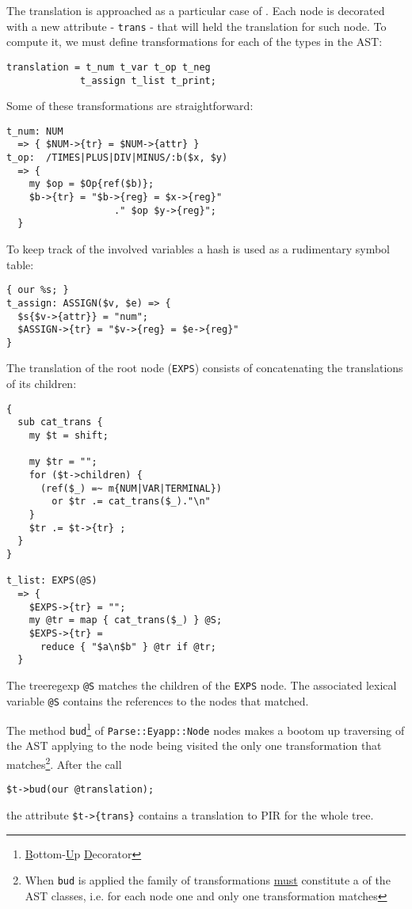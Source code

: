 The translation is approached as a particular case of 
. Each node is decorated with a new
attribute - \verb|trans| - that will held 
the translation for such node.
To compute it, we must define transformations
for each of the types in the AST:
\begin{verbatim}
translation = t_num t_var t_op t_neg
             t_assign t_list t_print;
\end{verbatim}

Some of these transformations are straightforward:
\begin{verbatim}
t_num: NUM 
  => { $NUM->{tr} = $NUM->{attr} }
t_op:  /TIMES|PLUS|DIV|MINUS/:b($x, $y)
  => {
    my $op = $Op{ref($b)};
    $b->{tr} = "$b->{reg} = $x->{reg}"
                   ." $op $y->{reg}";
  }
\end{verbatim}
To keep track of the involved variables
a hash is used as a rudimentary symbol table:
\begin{verbatim}
{ our %s; }
t_assign: ASSIGN($v, $e) => {
  $s{$v->{attr}} = "num";
  $ASSIGN->{tr} = "$v->{reg} = $e->{reg}"
}
\end{verbatim}
The translation of the root node (\verb|EXPS|)
consists of concatenating the translations
of its children:
\begin{verbatim}
{
  sub cat_trans {
    my $t = shift;

    my $tr = "";
    for ($t->children) {
      (ref($_) =~ m{NUM|VAR|TERMINAL})
        or $tr .= cat_trans($_)."\n"
    }
    $tr .= $t->{tr} ;
  }
}

t_list: EXPS(@S)
  => {
    $EXPS->{tr} = "";
    my @tr = map { cat_trans($_) } @S;
    $EXPS->{tr} =
      reduce { "$a\n$b" } @tr if @tr;
  }
\end{verbatim}
The treeregexp \verb|@S| matches the children
of the \verb|EXPS| node. The associated lexical variable \verb|@S| 
contains the references to the nodes that 
matched.

The method \verb|bud|\footnote{\underline{B}ottom-\underline{U}p \underline{D}ecorator}
of \verb|Parse::Eyapp::Node| nodes makes a bootom up traversing
of the AST applying to the node being visited the only one transformation that 
matches\footnote{When {\tt bud} is applied the family of transformations \underline{must} constitute
a  of the AST classes, i.e. for each node one and only one
transformation matches}.
After the call 
\begin{verbatim}
$t->bud(our @translation);
\end{verbatim}
the attribute \verb|$t->{trans}| contains 
a translation to PIR for the whole tree.

